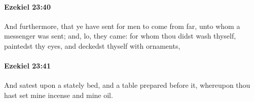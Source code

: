 		\paragraph{Ezekiel 23:40} %
			\label{EZEKIEL-23-40}

			And furthermore, that ye have sent for men to come from far, unto whom a messenger was sent; and, lo, they came: for whom thou didst wash thyself, paintedst thy eyes, and deckedst thyself with ornaments,


		\paragraph{Ezekiel 23:41} %
			\label{EZEKIEL-23-41}

			And satest upon a stately bed, and a table prepared before it, whereupon thou hast set mine incense and mine oil.


